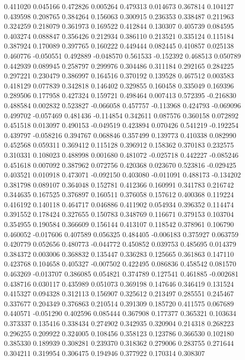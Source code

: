 0.411020
0.045166
0.472826
0.005264
0.479313
0.014673
0.367814
0.104127
0.439598
0.208765
0.384264
0.156063
0.300915
0.236353
0.338487
0.211963
0.324259
0.218079
0.361973
0.169522
0.412844
0.130307
0.405739
0.084595
0.403274
0.088847
0.356426
0.212934
0.386110
0.213521
0.335124
0.115184
0.387924
0.170089
0.397765
0.160222
0.449444
0.082445
0.410857
0.025138
0.460776
-0.050551
0.492889
-0.048570
0.561533
-0.152392
0.468513
0.050789
0.442939
0.089945
0.258797
0.299976
0.304486
0.311184
0.292165
0.284225
0.297221
0.230479
0.386997
0.164516
0.370192
0.139528
0.467512
0.003583
0.418129
0.077839
0.342818
0.146402
0.329855
0.160458
0.335049
0.169396
0.289506
0.177958
0.427324
0.159721
0.498464
0.007413
0.572395
-0.216830
0.488584
0.002832
0.523827
-0.066058
0.457757
-0.113968
0.424793
-0.069096
0.499702
-0.057469
0.481436
-0.114854
0.342611
0.087576
0.360158
0.072892
0.451518
0.013097
0.490153
-0.049519
0.423894
0.070426
0.541219
-0.192254
0.439797
-0.058216
0.394767
0.068846
0.357499
0.139773
0.410338
0.082990
0.452568
0.059311
0.369412
0.115128
0.396912
0.158362
0.370183
0.232575
0.310331
0.108023
0.488998
0.001680
0.481072
-0.025718
0.442227
-0.085246
0.451618
0.007092
0.387962
0.072756
0.420368
0.023670
0.523816
-0.029425
0.403521
0.010918
0.473071
-0.092150
0.403080
-0.011091
0.488173
-0.134202
0.381798
0.089107
0.364048
0.152781
0.412366
0.160991
0.341783
0.216742
0.344635
0.167525
0.376897
0.160511
0.376058
0.157612
0.400368
0.119224
0.416192
0.140118
0.464717
0.046886
0.411902
0.054934
0.396352
0.114474
0.391552
0.178424
0.327655
0.150783
0.348769
0.116671
0.379153
0.103704
0.354955
0.190584
0.366609
0.156144
0.413107
0.118542
0.378961
0.106790
0.460052
-0.017606
0.407589
0.056325
0.484405
-0.006183
0.375927
0.063759
0.420779
0.052656
0.480773
-0.044772
0.450852
0.039753
0.485695
0.014379
0.384372
0.003006
0.368832
0.135447
0.336283
0.125665
0.361863
0.147110
0.423768
0.104658
0.405327
-0.007502
0.422495
0.086836
0.458542
0.081570
0.463269
-0.013707
0.386085
0.054821
0.374789
0.127541
0.461885
-0.002681
0.438716
0.030117
0.435989
0.051073
0.369198
0.147646
0.346419
0.131524
0.415327
0.094328
0.312113
0.156907
0.325612
0.213497
0.285551
0.245467
0.337677
0.204349
0.376863
0.210514
0.391309
0.185720
0.411575
0.067689
0.440571
-0.051290
0.402596
0.085444
0.367908
0.177377
0.365321
0.103634
0.373337
0.135416
0.338434
0.274902
0.342935
0.320904
0.214318
0.268223
0.296255
0.209922
0.324005
0.108456
0.358123
0.123786
0.366530
0.102180
0.385330
0.189939
0.308281
0.239370
0.318362
0.279006
0.283755
0.271644
0.304211
0.319954
0.306475
0.194946
0.377922
0.170314
0.308307
